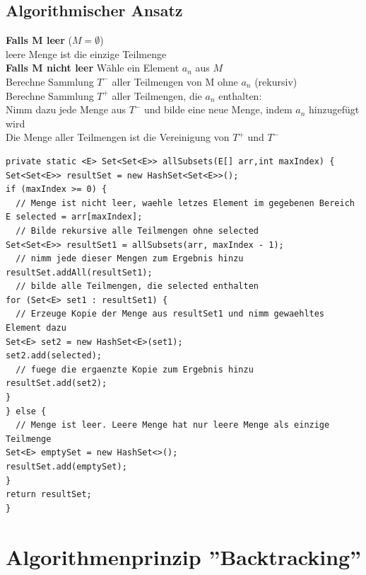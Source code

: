 \documentclass{scrreprt}
\newcommand\tab[1][1cm]{\hspace*{#1}}
\begin{document}
\subsection{Algorithmischer Ansatz}
\textbf{Falls M leer} ($M = \emptyset$)
\\\tab leere Menge ist die einzige Teilmenge
\\\textbf{Falls M nicht leer} Wähle ein Element $a_n$ aus $M$
\\\tab Berechne Sammlung $T^-$ aller Teilmengen von M ohne $a_n$ (rekursiv)
\\\tab Berechne Sammlung $T^+$ aller Teilmengen, die $a_n$ enthalten:
\\\tab Nimm dazu jede Menge aus $T^-$ und bilde eine neue Menge, indem $a_n$ hinzugefügt wird
\\\tab Die Menge aller Teilmengen ist die Vereinigung von $T^+$ und $T^-$
\\\begin{lstlisting}
private static <E> Set<Set<E>> allSubsets(E[] arr,int maxIndex) {
Set<Set<E>> resultSet = new HashSet<Set<E>>();
if (maxIndex >= 0) {
  // Menge ist nicht leer, waehle letzes Element im gegebenen Bereich
E selected = arr[maxIndex];
  // Bilde rekursive alle Teilmengen ohne selected
Set<Set<E>> resultSet1 = allSubsets(arr, maxIndex - 1);
  // nimm jede dieser Mengen zum Ergebnis hinzu
resultSet.addAll(resultSet1);
  // bilde alle Teilmengen, die selected enthalten
for (Set<E> set1 : resultSet1) {
  // Erzeuge Kopie der Menge aus resultSet1 und nimm gewaehltes Element dazu
Set<E> set2 = new HashSet<E>(set1);
set2.add(selected);
  // fuege die ergaenzte Kopie zum Ergebnis hinzu
resultSet.add(set2);
}
} else {
  // Menge ist leer. Leere Menge hat nur leere Menge als einzige Teilmenge
Set<E> emptySet = new HashSet<>();
resultSet.add(emptySet);
}
return resultSet;
}
\end{lstlisting}
\section{Algorithmenprinzip ''Backtracking''}
\end{document}
